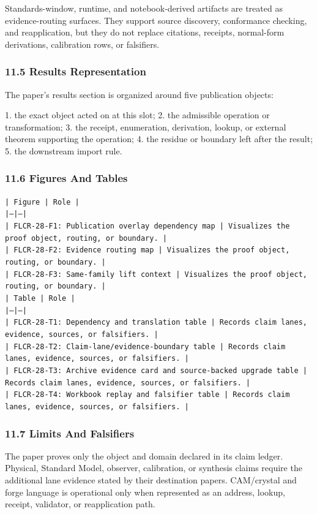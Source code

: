\documentclass[11pt]{article}
\begin{document}
Standards-window, runtime, and notebook-derived artifacts are treated
as evidence-routing surfaces. They support source discovery, conformance
checking, and reapplication, but they do not replace citations, receipts,
normal-form derivations, calibration rows, or falsifiers.

\subsubsection*{11.5 Results Representation}

The paper's results section is organized around five publication objects:

1. the exact object acted on at this slot;
2. the admissible operation or transformation;
3. the receipt, enumeration, derivation, lookup, or external theorem supporting
   the operation;
4. the residue or boundary left after the result;
5. the downstream import rule.

\subsubsection*{11.6 Figures And Tables}

\noindent\texttt{| Figure | Role |}\\
\noindent\texttt{|---|---|}\\
\noindent\texttt{| FLCR-28-F1: Publication overlay dependency map | Visualizes the proof object, routing, or boundary. |}\\
\noindent\texttt{| FLCR-28-F2: Evidence routing map | Visualizes the proof object, routing, or boundary. |}\\
\noindent\texttt{| FLCR-28-F3: Same-family lift context | Visualizes the proof object, routing, or boundary. |}\\

\noindent\texttt{| Table | Role |}\\
\noindent\texttt{|---|---|}\\
\noindent\texttt{| FLCR-28-T1: Dependency and translation table | Records claim lanes, evidence, sources, or falsifiers. |}\\
\noindent\texttt{| FLCR-28-T2: Claim-lane/evidence-boundary table | Records claim lanes, evidence, sources, or falsifiers. |}\\
\noindent\texttt{| FLCR-28-T3: Archive evidence card and source-backed upgrade table | Records claim lanes, evidence, sources, or falsifiers. |}\\
\noindent\texttt{| FLCR-28-T4: Workbook replay and falsifier table | Records claim lanes, evidence, sources, or falsifiers. |}\\

\subsubsection*{11.7 Limits And Falsifiers}

The paper proves only the object and domain declared in its claim ledger.
Physical, Standard Model, observer, calibration, or synthesis claims require
the additional lane evidence stated by their destination papers. CAM/crystal
and forge language is operational only when represented as an address, lookup,
receipt, validator, or reapplication path.
\end{document}
